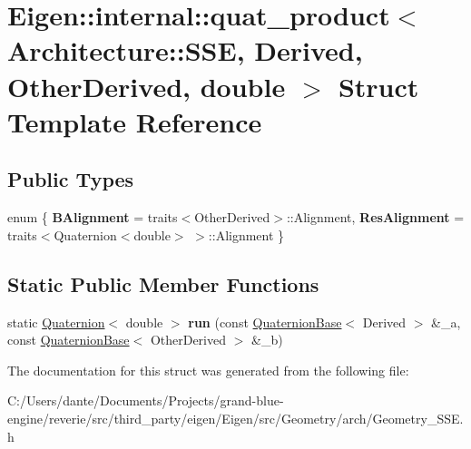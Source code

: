 \hypertarget{struct_eigen_1_1internal_1_1quat__product_3_01_architecture_1_1_s_s_e_00_01_derived_00_01_other_derived_00_01double_01_4}{}\section{Eigen\+::internal\+::quat\+\_\+product$<$ Architecture\+::S\+SE, Derived, Other\+Derived, double $>$ Struct Template Reference}
\label{struct_eigen_1_1internal_1_1quat__product_3_01_architecture_1_1_s_s_e_00_01_derived_00_01_other_derived_00_01double_01_4}
\subsection*{Public Types}
\begin{DoxyCompactItemize}
\item 
\mbox{\label{struct_eigen_1_1internal_1_1quat__product_3_01_architecture_1_1_s_s_e_00_01_derived_00_01_other_derived_00_01double_01_4_a5034d1314e2683edc111676e5a676450}} 
enum \{ {\bfseries B\+Alignment} = traits$<$Other\+Derived$>$\+::Alignment, 
{\bfseries Res\+Alignment} = traits$<$Quaternion$<$double$>$ $>$\+::Alignment
 \}
\end{DoxyCompactItemize}
\subsection*{Static Public Member Functions}
\begin{DoxyCompactItemize}
\item 
\mbox{\label{struct_eigen_1_1internal_1_1quat__product_3_01_architecture_1_1_s_s_e_00_01_derived_00_01_other_derived_00_01double_01_4_ad06b0370781a1ef18da8897a5f8c912f}} 
static \mbox{\hyperlink{class_eigen_1_1_quaternion}{Quaternion}}$<$ double $>$ {\bfseries run} (const \mbox{\hyperlink{class_eigen_1_1_quaternion_base}{Quaternion\+Base}}$<$ Derived $>$ \&\+\_\+a, const \mbox{\hyperlink{class_eigen_1_1_quaternion_base}{Quaternion\+Base}}$<$ Other\+Derived $>$ \&\+\_\+b)
\end{DoxyCompactItemize}


The documentation for this struct was generated from the following file\+:\begin{DoxyCompactItemize}
\item 
C\+:/\+Users/dante/\+Documents/\+Projects/grand-\/blue-\/engine/reverie/src/third\+\_\+party/eigen/\+Eigen/src/\+Geometry/arch/Geometry\+\_\+\+S\+S\+E.\+h\end{DoxyCompactItemize}
